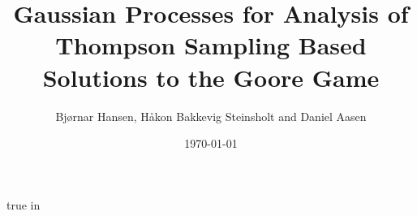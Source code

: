 \documentclass[12pt,a4paper,final]{report}
\author{Bjørnar Hansen, Håkon Bakkevig Steinsholt and Daniel Aasen}
\title{Gaussian Processes for Analysis of Thompson Sampling Based Solutions to 
the Goore Game }
\date{\today} %
\theoremstyle{definition}
\begin{document}
    \maketitle

    \newpage    
    
%   

    \tableofcontents
    \listoffigures
    \listoftables

     true in

    \newpage

        
                
    
    
    

    \begin{singlespace}
        
        
    \end{singlespace}

    \printglossary
\end{document}
